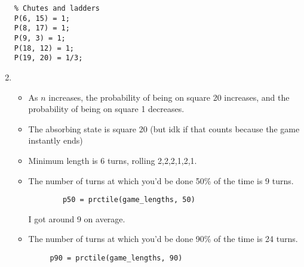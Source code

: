\documentclass{article}
\begin{document}
\begin{enumerate}
\begin{lstlisting}
% Chutes and ladders
P(6, 15) = 1;
P(8, 17) = 1;
P(9, 3) = 1;
P(18, 12) = 1;
P(19, 20) = 1/3;
\end{lstlisting}
\item \begin{itemize}
    \item As $n$ increases, the probability of being on square 20 increases, and the probability of being on square 1 decreases.
    \item The absorbing state is square 20 (but idk if that counts because the game instantly ends)
    \item Minimum length is 6 turns, rolling 2,2,2,1,2,1.
    \item The number of turns at which you'd be done 50\% of the time is 9 turns.\begin{lstlisting}
        p50 = prctile(game_lengths, 50)
    \end{lstlisting} I got around 9 on average.
    \item The number of turns at which you'd be done 90\% of the time is 
 24 turns.\begin{lstlisting}
     p90 = prctile(game_lengths, 90)
 \end{lstlisting}
\end{itemize}
\end{enumerate}
\end{document}
